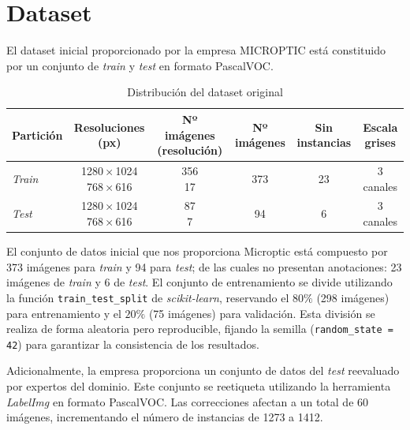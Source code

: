 \documentclass[12pt,a4paper,onecolumn,oneside]{report}
\begin{document}
\section{Dataset}
\label{sec:Dataset}
El dataset inicial proporcionado por la empresa MICROPTIC \cite{microptic} está constituido por un conjunto de \textit{train} y \textit{test} en formato PascalVOC.

\begin{table}[htbp]
\centering
\begingroup
\setlength{\tabcolsep}{8pt}
\small
\begin{adjustbox}{max width=\textwidth}
\begin{tabular}{l c c c c c}
\toprule
Partición & Resoluciones (px) & Nº imágenes (resolución) & Nº imágenes & Sin instancias & Escala grises\\
\midrule
\textit{Train} & \makecell[l]{1280\,×\,1024 \\ 768\,×\,616} & \makecell[r]{356 \\ 17} & 373 & 23 & 3 canales\\ 
\textit{Test}  & \makecell[l]{1280\,×\,1024 \\ 768\,×\,616} & \makecell[r]{87 \\ 7}   & 94  & 6  & 3 canales\\ 
\bottomrule
\end{tabular}
\end{adjustbox}
\endgroup
\caption{Distribución del dataset original}
\label{tab:dataset_original}
\end{table}

El conjunto de datos inicial que nos proporciona Microptic \cite{microptic} está compuesto por 373 imágenes para \textit{train} y 94 para \textit{test}; de las cuales no presentan anotaciones: 23 imágenes de \textit{train} y 6 de \textit{test}.
El conjunto de entrenamiento se divide utilizando la función \texttt{train\_test\_split} de \textit{scikit-learn}, reservando el $80\%$ (298 imágenes) para entrenamiento y el $20\%$ (75 imágenes) para validación. 
Esta división se realiza de forma aleatoria pero reproducible, fijando la semilla (\texttt{random\_state = 42}) para garantizar la consistencia de los resultados.

Adicionalmente, la empresa proporciona un conjunto de datos del \textit{test} reevaluado por expertos del dominio. Este conjunto se reetiqueta utilizando la herramienta \textit{LabelImg} \cite{labelimg_github} en formato PascalVOC. 
Las correcciones afectan a un total de 60 imágenes, incrementando el número de instancias de 1273 a 1412.
\end{document}
